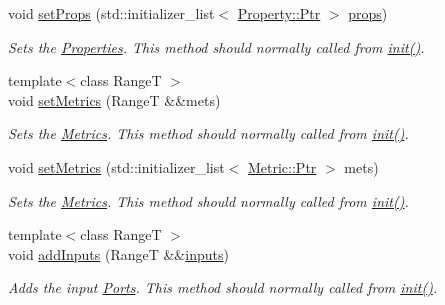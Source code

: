 \begin{DoxyCompactItemize}
void \hyperlink{classdg_1_1deepcore_1_1_node_ad395c871edf1de6cc630e1a19472cc93}{set\+Props} (std\+::initializer\+\_\+list$<$ \hyperlink{classdg_1_1deepcore_1_1_object_a4565c5c2ba828aaaa4354befbac8b2f9}{Property\+::\+Ptr} $>$ \hyperlink{classdg_1_1deepcore_1_1_node_a24db8fed9656e8dab99eaa0c1f02e3cb}{props})
\begin{DoxyCompactList}\small\item\em Sets the \hyperlink{classdg_1_1deepcore_1_1_property}{Properties}. This method should normally called from \hyperlink{classdg_1_1deepcore_1_1_object_a0982aef61087daaf910acfe8b6dcac99}{init()}. \end{DoxyCompactList}\item 
{\footnotesize template$<$class RangeT $>$ }\\void \hyperlink{classdg_1_1deepcore_1_1_node_a98e3da3dfc4823caaba39b42cbd258df}{set\+Metrics} (RangeT \&\&mets)
\begin{DoxyCompactList}\small\item\em Sets the \hyperlink{classdg_1_1deepcore_1_1_metric}{Metrics}. This method should normally called from \hyperlink{classdg_1_1deepcore_1_1_object_a0982aef61087daaf910acfe8b6dcac99}{init()}. \end{DoxyCompactList}\item 
void \hyperlink{classdg_1_1deepcore_1_1_node_a28313d67a357f9e63dbc618715f02888}{set\+Metrics} (std\+::initializer\+\_\+list$<$ \hyperlink{classdg_1_1deepcore_1_1_object_a4565c5c2ba828aaaa4354befbac8b2f9}{Metric\+::\+Ptr} $>$ mets)
\begin{DoxyCompactList}\small\item\em Sets the \hyperlink{classdg_1_1deepcore_1_1_metric}{Metrics}. This method should normally called from \hyperlink{classdg_1_1deepcore_1_1_object_a0982aef61087daaf910acfe8b6dcac99}{init()}. \end{DoxyCompactList}\item 
{\footnotesize template$<$class RangeT $>$ }\\void \hyperlink{classdg_1_1deepcore_1_1_node_a6ec1b419f8b7031649b6902cc690a85b}{add\+Inputs} (RangeT \&\&\hyperlink{classdg_1_1deepcore_1_1_node_a1e89da6fe3941b07685f0f57e6d2a4c6}{inputs})
\begin{DoxyCompactList}\small\item\em Adds the input \hyperlink{classdg_1_1deepcore_1_1_port}{Ports}. This method should normally called from \hyperlink{classdg_1_1deepcore_1_1_object_a0982aef61087daaf910acfe8b6dcac99}{init()}. \end{DoxyCompactList}\item 

\end{DoxyCompactItemize}
